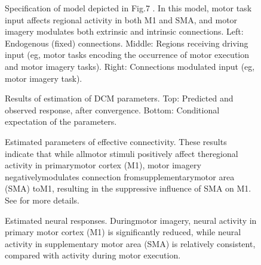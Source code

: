 \newpage
\begin{figure}[h!]
\centering
\vspace*{4cm}
\centerline{} 
 \vspace*{-4cm}
\caption{Specification of model depicted in Fig.7 \citep{tak2015dynamic}. In this model, motor task input affects regional activity in both M1 and SMA, and motor imagery modulates both extrinsic and intrinsic connections. Left: Endogenous (fixed) connections. Middle: Regions receiving driving input (eg, motor tasks encoding the occurrence of motor execution and motor imagery tasks). Right: Connections modulated input (eg, motor imagery task).} 
\label{fig:gui_con}
\end{figure}


\newpage
\begin{figure}[h!]
\centering
\vspace*{1.5cm}
\centerline{} 
 \vspace*{0.5cm}
\caption{Results of estimation of DCM parameters. Top: Predicted and observed response, after convergence. Bottom: Conditional expectation of the parameters.}
\label{fig:fit}
\end{figure}


\newpage
\begin{figure}[h!]
\centering
\vspace*{-0.3cm}
\centerline{} 
 \vspace*{-0.3cm}
\caption{Estimated parameters of effective connectivity. These results indicate that while allmotor stimuli positively affect theregional activity in primarymotor cortex (M1), motor imagery negativelymodulates connection fromsupplementarymotor area (SMA) toM1, resulting in the suppressive influence of SMA on M1. See \citep{tak2015dynamic} for more details. } 
\label{fig:est_conn}
\end{figure}

\newpage
\begin{figure}[h!]
\centering
\vspace*{0cm}
\centerline{} 
 \vspace*{-4cm}
\caption{Estimated neural responses. Duringmotor imagery, neural activity in primary motor cortex (M1) is significantly reduced, while neural activity in supplementary motor area (SMA) is relatively consistent, compared with activity during motor execution.}
\label{fig:est_neural}
\end{figure}


